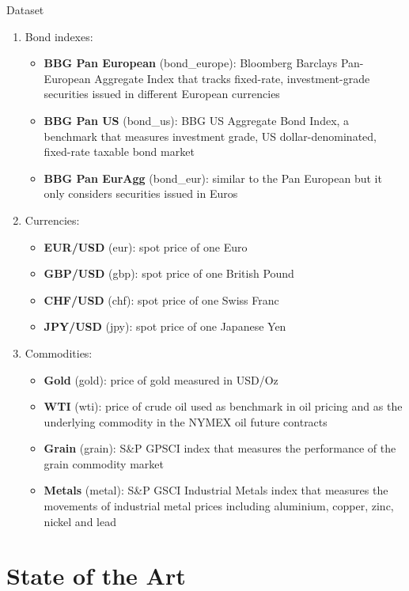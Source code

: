\documentclass[c, 10pt]{beamer}
\newcommand\Fontvi{\fontsize{8}{7.2}\selectfont}
\begin{document}
\begin{frame}[allowframebreaks]{Dataset}
\begin{enumerate}
	\item Bond indexes:
	\begin{itemize}
		\Fontvi
		\item \textbf{BBG Pan European} (bond\_europe): Bloomberg Barclays Pan-European Aggregate Index that tracks fixed-rate, investment-grade securities issued in different European currencies
		\item \textbf{BBG Pan US} (bond\_us): BBG US Aggregate Bond Index, a benchmark that measures investment grade, US dollar-denominated, fixed-rate taxable bond market
		\item \textbf{BBG Pan EurAgg} (bond\_eur): similar to the Pan European but it only considers securities issued in Euros
	\end{itemize} 
	\item Currencies:
	\begin{itemize}
		\Fontvi
		\item \textbf{EUR/USD} (eur): spot price of one Euro
		\item \textbf{GBP/USD} (gbp): spot price of one British Pound
		\item \textbf{CHF/USD} (chf): spot price of one Swiss Franc
		\item \textbf{JPY/USD} (jpy): spot price of one Japanese Yen
	\end{itemize}
	\item Commodities:
	\begin{itemize}
		\Fontvi
		\item \textbf{Gold} (gold): price of gold measured in USD/Oz
		\item \textbf{WTI} (wti): price of crude oil used as benchmark in oil pricing and as the underlying commodity in the NYMEX oil future contracts
		\item \textbf{Grain} (grain): S\&P GPSCI index that measures the performance of the grain commodity market
		\item \textbf{Metals} (metal): S\&P GSCI Industrial Metals index that measures the movements of industrial metal prices including aluminium, copper, zinc, nickel and lead
	\end{itemize}
\end{enumerate}
\end{frame}

\section{State of the Art}
\end{document}
